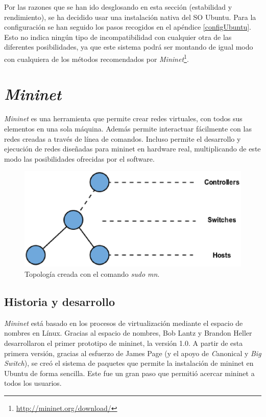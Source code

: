 \documentclass[a4paper,11pt]{book}
\begin{document}
Por las razones que se han ido desglosando en esta sección (estabilidad y rendimiento), se ha decidido usar una instalación nativa del \ac{SO} Ubuntu. Para la configuración se han seguido los pasos recogidos en el apéndice \ref{configUbuntu}. Esto no indica ningún tipo de incompatibilidad con cualquier otra de las diferentes posibilidades, ya que este sistema podrá ser montando de igual modo con cualquiera de los métodos recomendados por \emph{Mininet}\footnote{\url{http://mininet.org/download/}}.

\section{\emph{Mininet}}
\emph{Mininet} es una herramienta que permite crear redes virtuales, con todos sus elementos en una sola máquina. Además permite interactuar fácilmente con las redes creadas a través de línea de comandos. Incluso permite el desarrollo y ejecución de redes diseñadas para mininet en hardware real, multiplicando de este modo las posibilidades ofrecidas por el software. 

\begin{figure}[tb]
\centering
\includegraphics[scale=0.6]{./figuras/mininet1}
\caption{Topología creada con el comando \textit{sudo mn}.}
\label{mininet1}
\end{figure}

\subsection{Historia y desarrollo}
\emph{Mininet} está basado en los procesos de virtualización mediante el espacio de nombres en Línux\cite{mininetHistory}. Gracias al espacio de nombres, Bob Lantz y Brandon Heller desarrollaron el primer prototipo de mininet, la versión 1.0. A partir de esta primera versión, gracias al esfuerzo de James Page (y el apoyo de \textit{C}anonical y \textit{Big Switch}), se creó el sistema de paquetes que permite la instalación de mininet en Ubuntu de forma sencilla. Este fue un gran paso que permitió acercar mininet a todos los usuarios.
\end{document}
